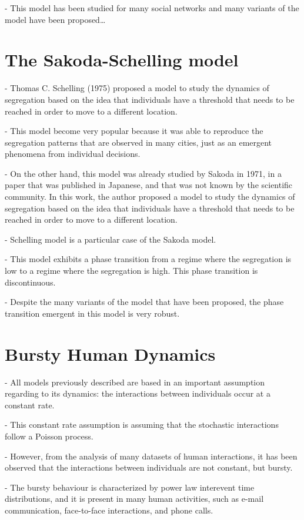 - This model has been studied for many social networks and many variants of the model have been proposed\dots

\section{\label{The Sakoda-Schelling model} The Sakoda-Schelling model}

- Thomas C. Schelling (1975) proposed a model to study the dynamics of segregation based on the idea that individuals have a threshold that needs to be reached in order to move to a different location. 

- This model become very popular because it was able to reproduce the segregation patterns that are observed in many cities, just as an emergent phenomena from individual decisions.

- On the other hand, this model was already studied by Sakoda in 1971, in a paper that was published in Japanese, and that was not known by the scientific community. In this work, the author proposed a model to study the dynamics of segregation based on the idea that individuals have a threshold that needs to be reached in order to move to a different location.

- Schelling model is a particular case of the Sakoda model.

- This model exhibits a phase transition from a regime where the segregation is low to a regime where the segregation is high. This phase transition is discontinuous. 

- Despite the many variants of the model that have been proposed, the phase transition emergent in this model is very robust.

\section{\label{sec: Bursty Human Dynamics} Bursty Human Dynamics}

- All models previously described are based in an important assumption regarding to its dynamics: the interactions between individuals occur at a constant rate.

- This constant rate assumption is assuming that the stochastic interactions follow a Poisson process. 

- However, from the analysis of many datasets of human interactions, it has been observed that the interactions between individuals are not constant, but bursty.

- The bursty behaviour is characterized by power law interevent time distributions, and it is present in many human activities, such as e-mail communication, face-to-face interactions, and phone calls.

